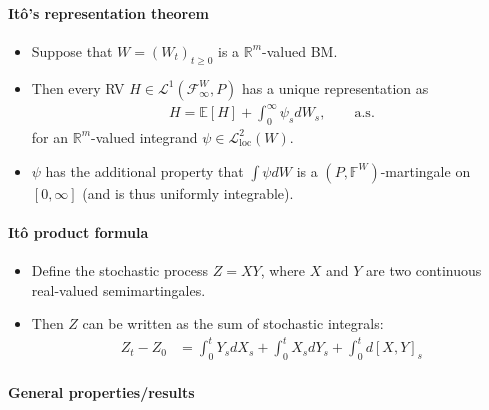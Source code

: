 \documentclass[a4paper,landscape,8pt,fleqn]{scrartcl}
\begin{document}
\begin{multicols*}{3}
\paragraph{Itô's representation theorem}

\begin{itemize}
\item Suppose that $W = (W_t)_{t \geq 0}$ is a $\mathbb{R}^m$-valued BM.
\item Then every RV $H \in \mathcal{L}^1(\mathcal{F}_\infty^W,P)$ has a unique representation as
\begin{align*}
H = \mathbb{E}[H] + \int_0^\infty \psi_s dW_s, \qquad \text{a.s.}
\end{align*}
for an $\mathbb{R}^m$-valued integrand $\psi \in \mathcal{L}_\text{loc}^2(W)$.
\item $\psi$ has the additional property that $\int \psi dW$ is a $(P, \mathbb{F}^W)$-martingale on $[0,\infty]$ (and is thus uniformly integrable).
\end{itemize}

\paragraph{Itô product formula}

\begin{itemize}
\item Define the stochastic process $Z = X Y$, where $X$ and $Y$ are two continuous real-valued semimartingales.
\item Then $Z$ can be written as the sum of stochastic integrals:
\begin{align*}
Z_t - Z_0 &= \int_0^t Y_s dX_s + \int_0^t X_s dY_s + \int_0^t d[X,Y]_s
\end{align*}
\end{itemize}

\paragraph{General properties/results}


\end{multicols*}
\end{document}
